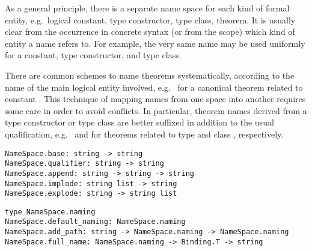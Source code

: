 \begin{isabellebody}
\begin{isamarkuptext}
  \medskip As a general principle, there is a separate name space for
  each kind of formal entity, e.g.\ logical constant, type
  constructor, type class, theorem.  It is usually clear from the
  occurrence in concrete syntax (or from the scope) which kind of
  entity a name refers to.  For example, the very same name  may be used uniformly for a constant, type constructor, and
  type class.

  There are common schemes to name theorems systematically, according
  to the name of the main logical entity involved, e.g.\  for a canonical theorem related to constant .
  This technique of mapping names from one space into another requires
  some care in order to avoid conflicts.  In particular, theorem names
  derived from a type constructor or type class are better suffixed in
  addition to the usual qualification, e.g.\ 
  and  for theorems related to type 
  and class , respectively.%
\end{isamarkuptext}%
\isamarkuptrue%
%
\isadelimmlref
%
\endisadelimmlref
%
\isatagmlref
%
\begin{isamarkuptext}%
\begin{mldecls}
  \verb|NameSpace.base: string -> string| \\
  \verb|NameSpace.qualifier: string -> string| \\
  \verb|NameSpace.append: string -> string -> string| \\
  \verb|NameSpace.implode: string list -> string| \\
  \verb|NameSpace.explode: string -> string list| \\
  \end{mldecls}
  \begin{mldecls}
  \verb|type NameSpace.naming| \\
  \verb|NameSpace.default_naming: NameSpace.naming| \\
  \verb|NameSpace.add_path: string -> NameSpace.naming -> NameSpace.naming| \\
  \verb|NameSpace.full_name: NameSpace.naming -> Binding.T -> string| \\
  \end{mldecls}

\end{isamarkuptext}
\end{isabellebody}
